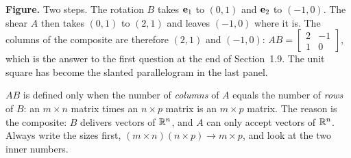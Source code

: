 \documentclass[11pt]{article}
\begin{document}
\textbf{Figure.} Two steps. The rotation $B$ takes $\mathbf{e}_1$ to $(0,1)$ and $\mathbf{e}_2$ to $(-1,0)$. The shear $A$ then takes $(0,1)$ to $(2,1)$ and leaves $(-1,0)$ where it is. The columns of the composite are therefore $(2,1)$ and $(-1,0)$: $AB=\begin{bmatrix}2&-1\\1&0\end{bmatrix}$, which is the answer to the first question at the end of Section~1.9. The unit square has become the slanted parallelogram in the last panel.

\begin{warn}
$AB$ is defined only when the number of \emph{columns} of $A$ equals the number of \emph{rows} of $B$: an $m\times n$ matrix times an $n\times p$ matrix is an $m\times p$ matrix. The reason is the composite: $B$ delivers vectors of $\mathbb{R}^n$, and $A$ can only accept vectors of $\mathbb{R}^n$. Always write the sizes first, $(m\times n)(n\times p)\to m\times p$, and look at the two inner numbers.
\end{warn}
\end{document}
